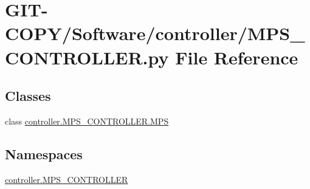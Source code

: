 \hypertarget{GIT-COPY_2Software_2controller_2MPS__CONTROLLER_8py}{}\section{G\+I\+T-\/\+C\+O\+P\+Y/\+Software/controller/\+M\+P\+S\+\_\+\+C\+O\+N\+T\+R\+O\+L\+L\+E\+R.py File Reference}
\label{GIT-COPY_2Software_2controller_2MPS__CONTROLLER_8py}
\subsection*{Classes}
\begin{DoxyCompactItemize}
\item 
class \hyperlink{classcontroller_1_1MPS__CONTROLLER_1_1MPS}{controller.\+M\+P\+S\+\_\+\+C\+O\+N\+T\+R\+O\+L\+L\+E\+R.\+M\+P\+S}
\end{DoxyCompactItemize}
\subsection*{Namespaces}
\begin{DoxyCompactItemize}
\item 
 \hyperlink{namespacecontroller_1_1MPS__CONTROLLER}{controller.\+M\+P\+S\+\_\+\+C\+O\+N\+T\+R\+O\+L\+L\+E\+R}
\end{DoxyCompactItemize}
